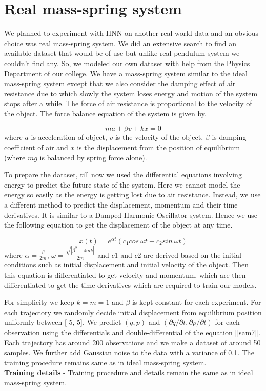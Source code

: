 \section{Real mass-spring system}
We planned to experiment with HNN on another real-world data and an obvious choice was real mass-spring system. We did an extensive search to find an available dataset that would be of use but unlike real pendulum system we couldn't find any. So, we modeled our own dataset with help from the Physics Department of our college. We have a mass-spring system similar to the ideal mass-spring system except that we also consider the damping effect of air resistance due to which slowly the system loses energy and motion of the system stops after a while. The force of air resistance is proportional to the velocity of the object. The force balance equation of the system is given by.

\begin{equation}
    ma + \beta v + kx = 0
\end{equation}
where \(a\) is acceleration of object, \(v\) is the velocity of the object, \(\beta\) is damping coefficient of air and \(x\) is the displacement from the position of equilibrium (where \(mg\) is balanced by spring force alone).

To prepare the dataset, till now we used the differential equations involving energy to predict the future state of the system. Here we cannot model the energy so easily as the energy is getting lost due to air resistance. Instead, we use a different method to predict the displacement, momentum and their time derivatives. It is similar to a Damped Harmonic Oscillator system. Hence we use the following equation to get the displacement of the object at any time.

\begin{equation}\label{sam7}
    x(t) = e^{\alpha t}(c_1 cos\:\omega t + c_2 sin\:\omega t)
\end{equation}
where \(\alpha = \frac{\beta}{2m}\), \(\omega = \frac{\sqrt{|\beta^2-4mk|}}{2m}\) and \(c1\) and \(c2\) are derived based on the initial conditions such as initial displacement and initial velocity of the object. Then this equation is differentiated to get velocity and momentum, which are then differentiated to get the time derivatives which are required to train our models.

For simplicity we keep \(k = m = 1\) and \(\beta\) is kept constant for each experiment. For each trajectory we randomly decide initial displacement from equilibrium position uniformly between [-5, 5]. We predict \((q, p)\) and \((\partial q/\partial t, \partial p/\partial t)\) for each observation using the differentials and double-differential of the equation [\ref{sam7}]. Each trajectory has around 200 observations and we make a dataset of around 50 samples. We further add Gaussian noise to the data with a variance of 0.1. The training procedure remains same as in ideal mass-spring system.\\
\textbf{Training details} - Training procedure and details remain the same as in ideal mass-spring system.

